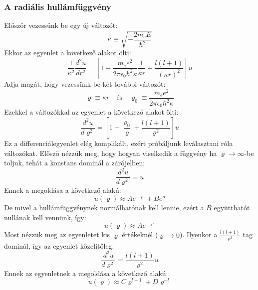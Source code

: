 \documentclass[a4paper,12pt]{article}
\begin{document}
\subsubsection*{A radiális hullámfüggvény}
Először vezessünk be egy új változót:
\begin{equation}
    \kappa \equiv \sqrt{- \frac{2m_e E}{\hbar^2}}
\end{equation}
Ekkor az egyenlet a következő alakot ölti:
\begin{equation}
   \frac{1}{\kappa^2} \frac{d^2 u}{dr^2} = \left[1 - \frac{m_e e^2}{2\pi \epsilon_0 \hbar^2 \kappa} \frac{1}{\kappa r} + \frac{l(l + 1)}{(\kappa r)^2}\right]u
\end{equation}
Adja magát, hogy vezessünk be két további változót:
\begin{equation}
    \varrho \equiv \kappa r \quad \text{és} \quad \varrho_0 \equiv \frac{m_e e^2}{2\pi \epsilon_0 \hbar^2 \kappa}
\end{equation}
Ezekkel a változókkal az egyenlet a következő alakot ölti:
\begin{equation}
   \frac{d^2 u}{d \varrho^2} = \left[1 - \frac{\varrho_0}{\varrho} + \frac{l(l + 1)}{\varrho^2}\right]u
\end{equation}
Ez a differenciálegyenlet elég komplikált, ezért próbáljunk leválasztani róla változókat. Előszö nézzük meg, hogy hogyan viselkedik
a függvény ha $\varrho \to \infty$-be toljuk, tehát a konstans dominál a zárójelben:
\begin{equation}
   \frac{d^2 u}{d \varrho^2} = u
\end{equation}
Ennek a megoldása a következő alakú:
\begin{equation}
    u(\varrho) \approx A e^{-\varrho} + B e^{\varrho}
\end{equation}
De mivel a hullámfüggvénynek normálhatónak kell lennie, ezért a $B$ együtthatót nullának kell vennünk, így:
\begin{equation}
    u(\varrho) \approx A e^{-\varrho}
\end{equation}
Most nézzük meg az egyenletet kis $\varrho$ értékeknél ($\varrho \to 0$). Ilyenkor a $\frac{l(l + 1)}{\varrho^2}$ tag dominál, így az egyenlet közelítőleg:
\begin{equation}
   \frac{d^2 u}{d \varrho^2} = \frac{l(l + 1)}{\varrho^2} u
\end{equation}
Ennek az egyenletnek a megoldása a következő alakú:
\begin{equation}
    u(\varrho) \approx C \varrho^{l + 1} + D \varrho^{-l}
\end{equation}
\end{document}
